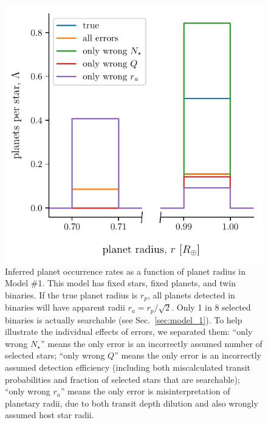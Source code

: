 \begin{figure}
    \begin{center}
        \includegraphics[width=\textwidth]{figures/errcases_rate_density_vs_radius_model_1_brokenx.pdf}
    \end{center}
    \caption{
    Inferred planet occurrence rates as a function of planet radius in Model 
    \#1.
    This model has fixed stars, fixed planets, and twin binaries.
    If the true planet radius is $r_p$, all planets 
    detected in binaries will have apparent radii $r_a = r_p/\sqrt{2}$.
    Only 1 in 8 selected binaries is actually searchable (see 
    Sec.~\ref{sec:model_1}).
    To help illustrate the individual effects of errors, we 
    separated them:
    ``only wrong $N_\star$'' means the only error is an incorrectly assumed 
    number of selected stars;
    ``only wrong $Q$'' means the only error is an incorrectly assumed 
    detection efficiency (including both miscalculated transit probabilities 
    and 
    fraction of selected stars that are searchable);
    ``only wrong $r_a$'' means the only error is misinterpretation of 
    planetary radii, due to both transit depth dilution and also wrongly 
    assumed host star radii.
    }
    \label{fig:errcases_model_1}
\end{figure}

